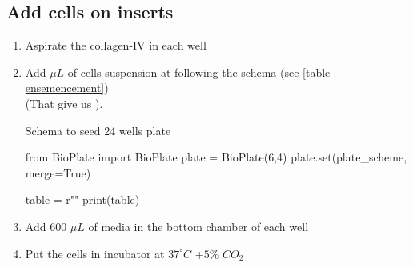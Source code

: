 \subsection{Add cells on inserts}

\begin{enumerate}
\item Aspirate the collagen-IV in each well
\item Add  $\mu L$ of cells suspension at  following the schema (see \ref{table-ensemencement}) \\ (That give us ).

\begin{table}[h]
\caption{Schema to seed 24 wells plate}
\begin{pycode}

from BioPlate import BioPlate
plate = BioPlate(6,4)
plate.set(plate_scheme, merge=True)

table = r""
print(table)
\end{pycode}
\label{table-ensemencement}
\end{table}
\item Add 600 $\mu L$ of media in the bottom chamber of each well
\item Put the cells in incubator at $37^\circ C$ +$5\%$ $CO_2$

\end{enumerate}
